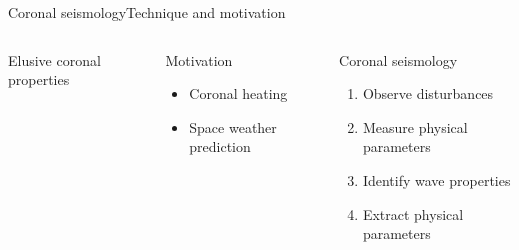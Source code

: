 \documentclass[11pt,table]{beamer}
\begin{document}
\begin{frame}{Coronal seismology}{Technique and motivation}
\begin{columns}
\begin{block}{Elusive coronal properties}
\begin{itemize}
            \end{itemize}
        \end{block}
        \begin{block}{Motivation}
            \begin{itemize}
                \item Coronal heating
                \item Space weather prediction
            \end{itemize}
        \end{block}
        \begin{block}{Coronal seismology}
            \begin{enumerate}
                \item Observe disturbances
                \item Measure physical parameters
                \item Identify wave properties
                \item Extract physical parameters
            \end{enumerate}
        \end{block}
    \end{columns}
\end{frame}%
\end{document}

